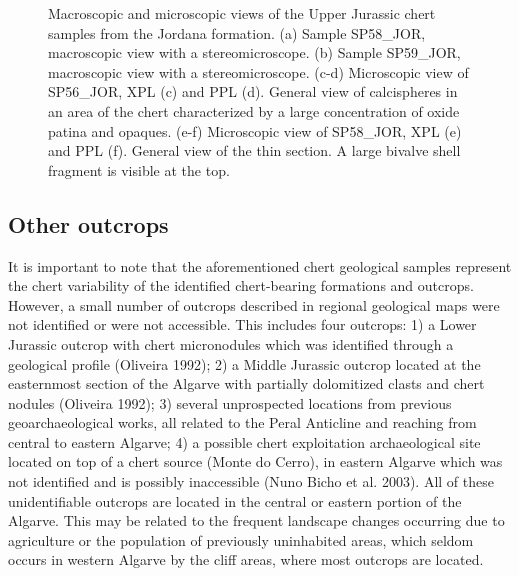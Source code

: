 \documentclass[
  a4paper,
  DIV=11,
  numbers=noendperiod]{scrreprt}
\begin{document}
\begin{figure}


\caption{\label{fig-frames-ujplate}Macroscopic and microscopic views of
the Upper Jurassic chert samples from the Jordana formation. (a) Sample
SP58\_JOR, macroscopic view with a stereomicroscope. (b) Sample
SP59\_JOR, macroscopic view with a stereomicroscope. (c-d) Microscopic
view of SP56\_JOR, XPL (c) and PPL (d). General view of calcispheres in
an area of the chert characterized by a large concentration of oxide
patina and opaques. (e-f) Microscopic view of SP58\_JOR, XPL (e) and PPL
(f). General view of the thin section. A large bivalve shell fragment is
visible at the top.}

\end{figure}%

\subsection*{Other outcrops}\label{other-outcrops}

It is important to note that the aforementioned chert geological samples
represent the chert variability of the identified chert-bearing
formations and outcrops. However, a small number of outcrops described
in regional geological maps were not identified or were not accessible.
This includes four outcrops: 1) a Lower Jurassic outcrop with chert
micronodules which was identified through a geological profile (Oliveira
1992); 2) a Middle Jurassic outcrop located at the easternmost section
of the Algarve with partially dolomitized clasts and chert nodules
(Oliveira 1992); 3) several unprospected locations from previous
geoarchaeological works, all related to the Peral Anticline and reaching
from central to eastern Algarve; 4) a possible chert exploitation
archaeological site located on top of a chert source (Monte do Cerro),
in eastern Algarve which was not identified and is possibly inaccessible
(Nuno Bicho et al. 2003). All of these unidentifiable outcrops are
located in the central or eastern portion of the Algarve. This may be
related to the frequent landscape changes occurring due to agriculture
or the population of previously uninhabited areas, which seldom occurs
in western Algarve by the cliff areas, where most outcrops are located.
\end{document}
